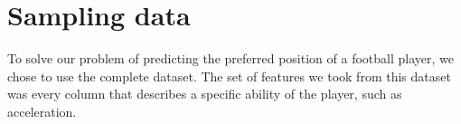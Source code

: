 \section{Sampling data}

To solve our problem of predicting the preferred position of a football player, we chose to use the complete dataset. The set of features we took from this dataset was every column that describes a specific ability of the player, such as acceleration. 